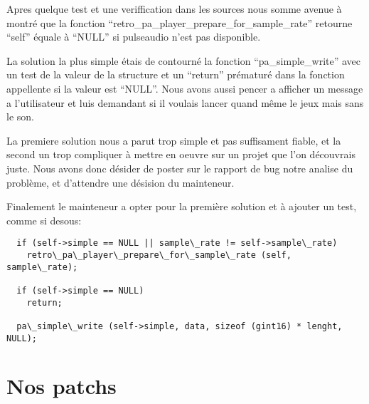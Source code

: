 \documentclass[12pt]{report}
\begin{document}
Apres quelque test et une veriffication dans les sources nous somme avenue à montré
que la fonction ``retro\_pa\_player\_prepare\_for\_sample\_rate'' retourne ``self''
équale à ``NULL'' si pulseaudio n'est pas disponible.

La solution la plus simple étais de contourné la fonction ``pa\_simple\_write''
avec un test de la valeur de la structure et un ``return'' prématuré dans la fonction
appellente si la valeur est ``NULL''. Nous avons aussi pencer a afficher un message a
l'utilisateur et luis demandant si il voulais lancer quand même le jeux mais sans le son.

La premiere solution nous a parut trop simple et pas suffisament fiable, et la
second un trop compliquer à mettre en oeuvre sur un projet que l'on découvrais juste.
Nous avons donc désider de poster sur le rapport de bug notre analise du problème, et
d'attendre une désision du mainteneur.

Finalement le mainteneur a opter pour la première solution et à ajouter un test, comme
si desous:
\begin{verbatim}
  if (self->simple == NULL || sample\_rate != self->sample\_rate)
    retro\_pa\_player\_prepare\_for\_sample\_rate (self, sample\_rate);

  if (self->simple == NULL)
    return;

  pa\_simple\_write (self->simple, data, sizeof (gint16) * lenght, NULL);
\end{verbatim}

\section{Nos patchs}
\end{document}
